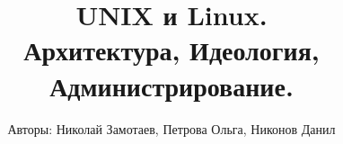 \begin{titlepage}
\title{\Huge \textbf{UNIX и Linux. \\ Архитектура, Идеология, \\ Администрирование.}}
\author{Авторы: Николай Замотаев, Петрова Ольга, Никонов Данил}
\maketitle

\end{titlepage}
